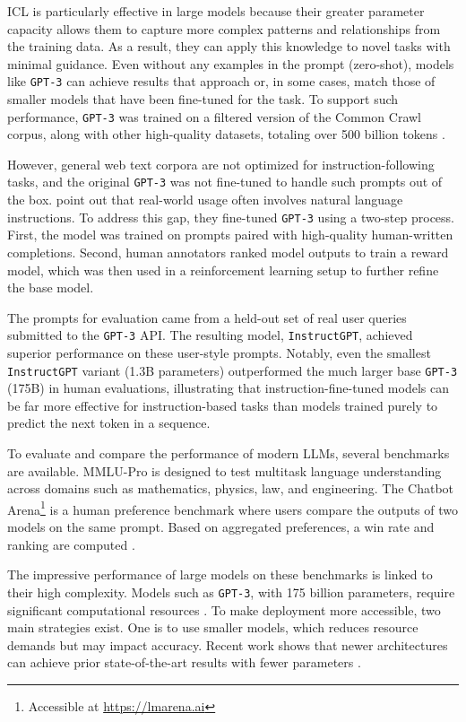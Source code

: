 \documentclass[a4paper,oneside,bibliography=totoc]{scrbook}
\begin{document}
\Ac{ICL} is particularly effective in large models because their greater parameter capacity allows them to capture more complex patterns and relationships from the training data. As a result, they can apply this knowledge to novel tasks with minimal guidance. Even without any examples in the prompt (zero-shot), models like \texttt{GPT-3} can achieve results that approach or, in some cases, match those of smaller models that have been fine-tuned for the task. To support such performance, \texttt{GPT-3} was trained on a filtered version of the Common Crawl corpus, along with other high-quality datasets, totaling over 500 billion tokens \cite{Brown2020}.

However, general web text corpora are not optimized for instruction-following tasks, and the original \texttt{GPT-3} was not fine-tuned to handle such prompts out of the box. \citet{Ouyang2022} point out that real-world usage often involves natural language instructions. To address this gap, they fine-tuned \texttt{GPT-3} using a two-step process. First, the model was trained on prompts paired with high-quality human-written completions. Second, human annotators ranked model outputs to train a reward model, which was then used in a reinforcement learning setup to further refine the base model.

The prompts for evaluation came from a held-out set of real user queries submitted to the \texttt{GPT-3} API. The resulting model, \texttt{InstructGPT}, achieved superior performance on these user-style prompts. Notably, even the smallest \texttt{InstructGPT} variant (1.3B parameters) outperformed the much larger base \texttt{GPT-3} (175B) in human evaluations, illustrating that instruction-fine-tuned models can be far more effective for instruction-based tasks than models trained purely to predict the next token in a sequence.


To evaluate and compare the performance of modern \acp{LLM}, several benchmarks are available. MMLU-Pro \cite{Wang2024} is designed to test multitask language understanding across domains such as mathematics, physics, law, and engineering. The Chatbot Arena\footnote{Accessible at \url{https://lmarena.ai}} is a human preference benchmark where users compare the outputs of two models on the same prompt. Based on aggregated preferences, a win rate and ranking are computed \cite{Chiang2024}.

The impressive performance of large models on these benchmarks is linked to their high complexity. Models such as \texttt{GPT-3}, with 175 billion parameters, require significant computational resources \cite{Brown2020,Frantar2023}. To make deployment more accessible, two main strategies exist. One is to use smaller models, which reduces resource demands but may impact accuracy. Recent work shows that newer architectures can achieve prior state-of-the-art results with fewer parameters \cite{Grattafiori2024,Meta2024}.
\end{document}
